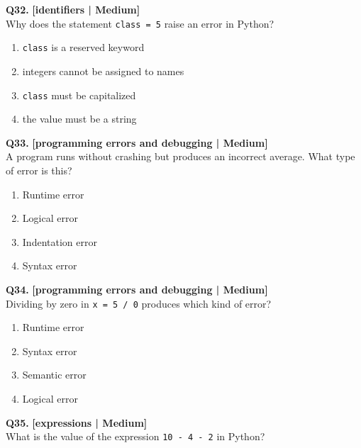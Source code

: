 \noindent\textbf{Q32.} \hfill {\small\color{LPUOrange}\textbf{[identifiers | Medium]}}\\[2pt]
Why does the statement \texttt{class = 5} raise an error in Python?

\begin{enumerate}[label=(\alph*),topsep=2pt,itemsep=1pt,partopsep=0pt,parsep=0pt]
    \item \relax \texttt{class} is a reserved keyword
    \item \relax integers cannot be assigned to names
    \item \relax \texttt{class} must be capitalized
    \item \relax the value must be a string
\end{enumerate}
\vspace{2mm}

\noindent\textbf{Q33.} \hfill {\small\color{LPUOrange}\textbf{[programming errors and debugging | Medium]}}\\[2pt]
A program runs without crashing but produces an incorrect average. What type of error is this?

\begin{enumerate}[label=(\alph*),topsep=2pt,itemsep=1pt,partopsep=0pt,parsep=0pt]
    \item \relax Runtime error
    \item \relax Logical error
    \item \relax Indentation error
    \item \relax Syntax error
\end{enumerate}
\vspace{2mm}

\noindent\textbf{Q34.} \hfill {\small\color{LPUOrange}\textbf{[programming errors and debugging | Medium]}}\\[2pt]
Dividing by zero in \texttt{x = 5 / 0} produces which kind of error?

\begin{enumerate}[label=(\alph*),topsep=2pt,itemsep=1pt,partopsep=0pt,parsep=0pt]
    \item \relax Runtime error
    \item \relax Syntax error
    \item \relax Semantic error
    \item \relax Logical error
\end{enumerate}
\vspace{2mm}

\noindent\textbf{Q35.} \hfill {\small\color{LPUOrange}\textbf{[expressions | Medium]}}\\[2pt]
What is the value of the expression \texttt{10 - 4 - 2} in Python?

